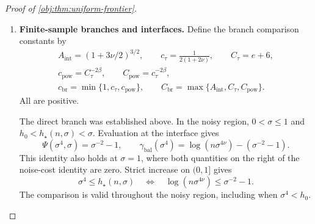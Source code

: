 \begin{proof}[Proof of \cref{obj:thm:uniform-frontier}]
\begin{enumerate}
For completeness, the mean bounds imply
\[
|\theta(P)|=|\mu_1(P,0)-\mu_0(P,0)|\le\frac12.
\]
Thus the constant estimator zero has worst expected absolute error at most
\(1/2\), and the constant interval \([-1,1]\) has coverage one and length two.
Both extended minimax objectives are consequently finite. Conversion to real
numbers preserves their comparisons with the selected procedures.

Put
\[
C_{\mathrm{mat}}=2C_{\mathrm{up}}>0.
\]
Combining the lower comparisons, the finite certificate, and the upper comparison gives
\[
\begin{aligned}
c_{\mathrm{mat}}r_\beta(n,\sigma)
&\le R_\beta(n,\sigma)
\le\sup_{P\in\mathcal M_\beta(\sigma)}
 \mathbb E_{P,n}|\widetilde\theta_{\beta,n,\sigma}-\theta(P)|\\
&\le E_\beta(n,\sigma)
\le C_{\mathrm{mat}}r_\beta(n,\sigma),\\
c_{\mathrm{mat}}r_\beta(n,\sigma)
&\le\mathcal L_\beta(n,\sigma)
\le\sup_{P\in\mathcal M_\beta(\sigma)}
 \mathbb E_{P,n}\operatorname{length}(\widetilde I_{\beta,n,\sigma})\\
&\le2E_\beta(n,\sigma)
\le C_{\mathrm{mat}}r_\beta(n,\sigma).
\end{aligned}
\]
The lower transfer ranges over the stated randomized decision classes, with
arbitrary procedure degree.

\item \textbf{Finite-sample branches and interfaces.}
Define the branch comparison constants by
\[
\begin{gathered}
A_{\mathrm{int}}=(1+3\nu/2)^{3/2},\qquad
c_\tau=\frac1{2(1+2\nu)},\qquad C_\tau=e+6,\\
c_{\mathrm{pow}}=C_\tau^{-2\beta},\qquad
C_{\mathrm{pow}}=c_\tau^{-2\beta},\\
c_{\mathrm{br}}=\min\{1,c_\tau,c_{\mathrm{pow}}\},
\qquad
C_{\mathrm{br}}=\max\{A_{\mathrm{int}},C_\tau,C_{\mathrm{pow}}\}.
\end{gathered}
\]
All are positive.

The direct branch was established above. In the noisy region,
\(0<\sigma\le1\) and \(h_0<h_\star(n,\sigma)<\sigma\). Evaluation at the interface gives
\[
\Psi(\sigma^4,\sigma)=\sigma^{-2}-1,
\qquad
\gamma_{\mathrm{bal}}(\sigma^4)
=\log(n\sigma^{4\nu})-(\sigma^{-2}-1).
\]
This identity also holds at \(\sigma=1\), where both quantities on the right
of the noise-cost identity are zero. Strict increase on \((0,1]\) gives
\[
\sigma^4\le h_\star(n,\sigma)
\quad\Longleftrightarrow\quad
\log(n\sigma^{4\nu})\le\sigma^{-2}-1.
\]
The comparison is valid throughout the noisy region, including when
\(\sigma^4<h_0\).


\end{enumerate}
\end{proof}

